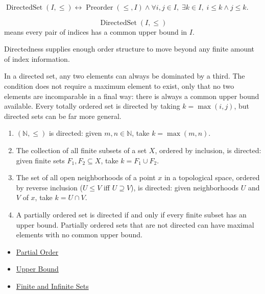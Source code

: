\begin{remark*}
$\operatorname{DirectedSet}(I,\leq)\leftrightarrow
\operatorname{Preorder}(\leq,I)\wedge
\forall i,j\in I,\;\exists k\in I,\;i\leq k\wedge j\leq k$.
\end{remark*}

\begin{remark*}
\[
  \operatorname{DirectedSet}(I,\leq)
\] means every pair of indices has a common
upper bound in $I$.
\end{remark*}

\begin{remark*}[Interpretation]
Directedness supplies enough order structure to move beyond any finite amount
of index information.
\end{remark*}

\begin{remark*}[Exposition]
In a directed set, any two elements can always be dominated by a third. The
condition does not require a maximum element to exist, only that no two
elements are incomparable in a final way: there is always a common upper bound
available. Every totally ordered set is directed by taking $k=\max(i,j)$, but
directed sets can be far more general.
\end{remark*}

\begin{remark*}[Exposition]
\begin{enumerate}[label=(\roman*)]
\item $(\mathbb{N}, \leq)$ is directed: given $m, n \in \mathbb{N}$, take
$k = \max(m,n)$.
\item The collection of all finite subsets of a set $X$, ordered by inclusion,
is directed: given finite sets $F_1, F_2 \subseteq X$, take $k = F_1 \cup F_2$.
\item The set of all open neighborhoods of a point $x$ in a topological space,
ordered by reverse inclusion ($U \leq V$ iff $U \supseteq V$), is directed:
given neighborhoods $U$ and $V$ of $x$, take $k = U \cap V$.
\item A partially ordered set is directed if and only if every finite subset has
an upper bound. Partially ordered sets that are not directed can have maximal
elements with no common upper bound.
\end{enumerate}
\end{remark*}

\begin{dependencies}
\begin{itemize}
  \item \hyperref[def:partial-order]{Partial Order}
  \item \hyperref[def:upper-bound]{Upper Bound}
  \item \hyperref[def:finite-infinite]{Finite and Infinite Sets}
\end{itemize}
\end{dependencies}

